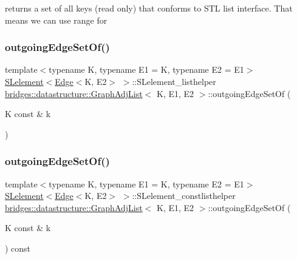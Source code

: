 returns a set of all keys (read only) that conforms to S\+TL list interface. That means we can use range for \mbox{\label{classbridges_1_1datastructure_1_1_graph_adj_list_ac066da800ab88dc2e55a89650e08bb78}} 
\subsubsection{\texorpdfstring{outgoing\+Edge\+Set\+Of()}{outgoingEdgeSetOf()}\hspace{0.1cm}{\footnotesize\ttfamily [1/2]}}
{\footnotesize\ttfamily template$<$typename K, typename E1 = K, typename E2 = E1$>$ \\
\mbox{\hyperlink{classbridges_1_1datastructure_1_1_s_lelement}{S\+Lelement}}$<$\mbox{\hyperlink{classbridges_1_1datastructure_1_1_edge}{Edge}}$<$K, E2$>$ $>$\+::S\+Lelement\+\_\+listhelper \mbox{\hyperlink{classbridges_1_1datastructure_1_1_graph_adj_list}{bridges\+::datastructure\+::\+Graph\+Adj\+List}}$<$ K, E1, E2 $>$\+::outgoing\+Edge\+Set\+Of (\begin{DoxyParamCaption}\item[{K const \&}]{k }\end{DoxyParamCaption})\hspace{0.3cm}{\ttfamily [inline]}}

\mbox{\label{classbridges_1_1datastructure_1_1_graph_adj_list_ab0677da029442194925f8167cc2b8638}} 
\subsubsection{\texorpdfstring{outgoing\+Edge\+Set\+Of()}{outgoingEdgeSetOf()}\hspace{0.1cm}{\footnotesize\ttfamily [2/2]}}
{\footnotesize\ttfamily template$<$typename K, typename E1 = K, typename E2 = E1$>$ \\
\mbox{\hyperlink{classbridges_1_1datastructure_1_1_s_lelement}{S\+Lelement}}$<$\mbox{\hyperlink{classbridges_1_1datastructure_1_1_edge}{Edge}}$<$K, E2$>$ $>$\+::S\+Lelement\+\_\+constlisthelper \mbox{\hyperlink{classbridges_1_1datastructure_1_1_graph_adj_list}{bridges\+::datastructure\+::\+Graph\+Adj\+List}}$<$ K, E1, E2 $>$\+::outgoing\+Edge\+Set\+Of (\begin{DoxyParamCaption}\item[{K const \&}]{k }\end{DoxyParamCaption}) const\hspace{0.3cm}{\ttfamily [inline]}}

